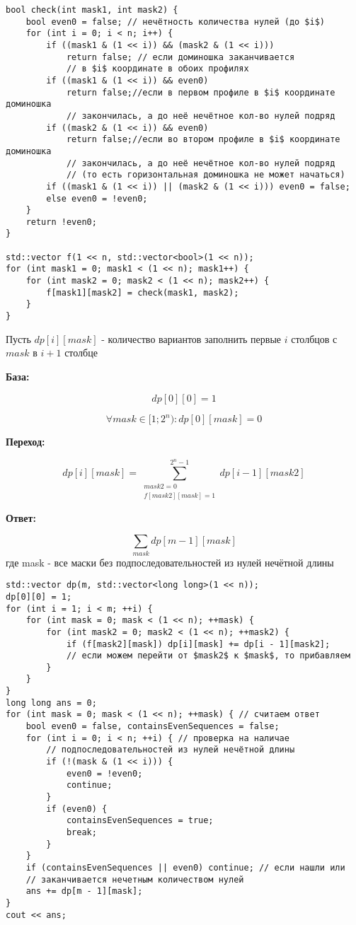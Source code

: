 \begin{verbatim}
bool check(int mask1, int mask2) {
    bool even0 = false; // нечётность количества нулей (до $i$)
    for (int i = 0; i < n; i++) {
        if ((mask1 & (1 << i)) && (mask2 & (1 << i)))
            return false; // если доминошка заканчивается
            // в $i$ координате в обоих профилях
        if ((mask1 & (1 << i)) && even0)
            return false;//если в первом профиле в $i$ координате доминошка
            // закончилась, а до неё нечётное кол-во нулей подряд
        if ((mask2 & (1 << i)) && even0)
            return false;//если во втором профиле в $i$ координате доминошка
            // закончилась, а до неё нечётное кол-во нулей подряд
            // (то есть горизонтальная доминошка не может начаться)
        if ((mask1 & (1 << i)) || (mask2 & (1 << i))) even0 = false;
        else even0 = !even0;
    }
    return !even0;
}

std::vector f(1 << n, std::vector<bool>(1 << n));
for (int mask1 = 0; mask1 < (1 << n); mask1++) {
    for (int mask2 = 0; mask2 < (1 << n); mask2++) {
        f[mask1][mask2] = check(mask1, mask2);
    }
}
\end{verbatim}

Пусть $dp[i][mask]$ - количество вариантов заполнить первые $i$ столбцов с $mask$ в $i + 1$ столбце

\textbf{База:}

$$dp[0][0] = 1$$

$$\forall mask \in [{1;2^n}): dp[0][mask] = 0$$

\textbf{Переход:}

$$dp[i][mask] = \sum_{\substack{mask2 = 0 \\ f[mask2][mask] = 1}}^{2^n - 1} dp[i - 1][mask2]$$

\textbf{Ответ:}

$$\sum_{mask} dp[m - 1][mask]$$
где mask - все маски без подпоследовательностей из нулей нечётной длины

\begin{verbatim}
std::vector dp(m, std::vector<long long>(1 << n));
dp[0][0] = 1;
for (int i = 1; i < m; ++i) {
    for (int mask = 0; mask < (1 << n); ++mask) {
        for (int mask2 = 0; mask2 < (1 << n); ++mask2) {
            if (f[mask2][mask]) dp[i][mask] += dp[i - 1][mask2];
            // если можем перейти от $mask2$ к $mask$, то прибавляем
        }
    }
}
long long ans = 0;
for (int mask = 0; mask < (1 << n); ++mask) { // считаем ответ
    bool even0 = false, containsEvenSequences = false;
    for (int i = 0; i < n; ++i) { // проверка на наличае
        // подпоследовательностей из нулей нечётной длины
        if (!(mask & (1 << i))) {
            even0 = !even0;
            continue;
        }
        if (even0) {
            containsEvenSequences = true;
            break;
        }
    }
    if (containsEvenSequences || even0) continue; // если нашли или
    // заканчивается нечетным количеством нулей
    ans += dp[m - 1][mask];
}
cout << ans;
\end{verbatim}

\begin{problem}

\end{problem}